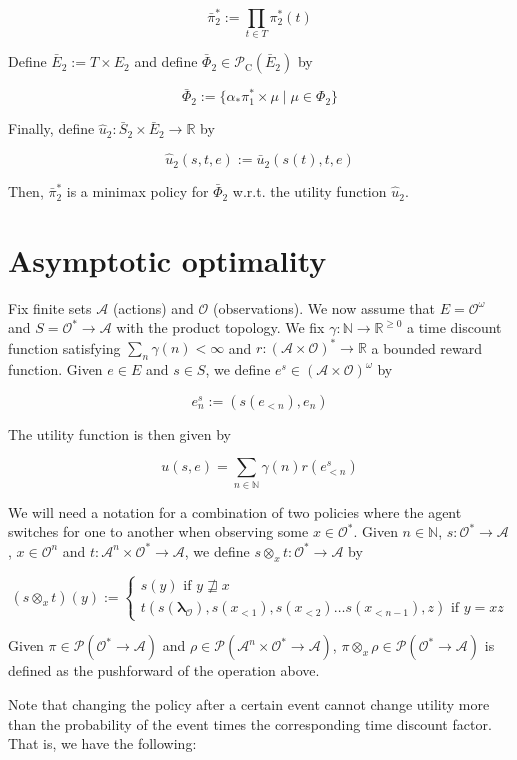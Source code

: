 \documentclass[a4paper]{article}
\newcommand{\Nats}{\mathbb{N}}
\newcommand{\Reals}{\mathbb{R}}
\newcommand{\Estr}{\bm{\lambda}}
\newcommand{\Prob}{\mathcal{P}}
\newcommand{\Act}{\mathcal{A}}
\newcommand{\Obs}{\mathcal{O}}
\newcommand{\ObsO}{\Obs^\omega}
\newcommand{\Pol}{\Obs^* \rightarrow \Act}
\newcommand{\CC}{\mathcal{P}_{\operatorname{C}}}
\begin{document}
$${\bar{\pi}_2^* := \prod_{t \in T} \pi_2^*(t)}$$

Define ${\bar{E}_2:=T \times E_2}$ and define ${\bar{\Phi}_2 \in \CC(\bar{E}_2)}$ by

$$\bar{\Phi}_2:=\{\alpha_* \pi_1^* \times \mu \mid \mu \in \Phi_2\}$$

Finally, define ${\hat{u}_2: \bar{S}_2 \times \bar{E}_2 \rightarrow \Reals}$ by

$$\hat{u}_2(s,t,e):=\bar{u}_2(s(t),t,e)$$

Then, ${\bar{\pi}_2^*}$ is a minimax policy for ${\bar{\Phi}_2}$ w.r.t. the utility function ${\hat{u}_2}$.

\section{Asymptotic optimality}

Fix finite sets ${\Act}$ (actions) and ${\Obs}$ (observations). We now assume that ${E=\ObsO}$ and ${S=\Pol}$ with the product topology. We fix ${\gamma: \Nats \rightarrow \Reals^{\geq 0}}$ a time discount function satisfying ${\sum_n \gamma(n) < \infty}$ and ${r: (\Act \times \Obs)^* \rightarrow \Reals}$ a bounded reward function. Given ${e \in E}$ and ${s \in S}$, we define ${e^s \in (\Act \times \Obs)^\omega}$ by

$${e^s_n:=(s(e_{<n}),e_n)}$$

The utility function is then given by

$$u(s,e)=\sum_{n \in \Nats} \gamma(n) r(e^s_{<n})$$

We will need a notation for a combination of two policies where the agent switches for one to another when observing some ${x \in \Obs^*}$. Given ${n \in \Nats}$, ${s: \Pol}$, ${x \in \Obs^n}$ and ${t: \Act^n \times \Pol}$, we define ${s \otimes_x t: \Pol}$ by

$$(s \otimes_x t)(y):=\begin{cases}s(y) \text{ if } y \not\sqsupseteq x \\t(s(\Estr_\Obs),s(x_{<1}), s(x_{<2}) \ldots s(x_{<{n-1}}),z) \text{ if } y=xz\end{cases}$$

Given ${\pi \in \Prob(\Pol)}$ and ${\rho \in \Prob(\Act^n \times \Pol)}$, ${\pi \otimes_x \rho \in \Prob(\Pol)}$ is defined as the pushforward of the operation above.

Note that changing the policy after a certain event cannot change utility more than the probability of the event times the corresponding time discount factor. That is, we have the following:
\end{document}
